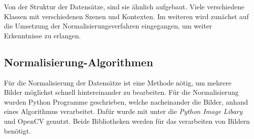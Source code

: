 \documentclass[a4paper,12pt,oneside]{article}
\begin{document}
Von der Struktur der Datensätze, sind sie ähnlich aufgebaut. Viele verschiedene Klassen mit verschiedenen Szenen und Kontexten. Im weiteren wird zunächst auf die Umsetzung der Normalisierungsverfahren eingegangen, um weiter Erkenntnisse zu erlangen.
\subsection{Normalisierung-Algorithmen}\label{s.nalgorithmen}
Für die Normalisierung der Datensätze ist eine Methode nötig, um mehrere Bilder möglichst schnell hintereinander zu bearbeiten. Für die Normalisierung wurden Python Programme geschrieben, welche nacheinander die Bilder, anhand eines Algorithmus verarbeitet. Dafür wurde mit unter die \textit{Python Image Libary} und OpenCV genutzt. Beide Bibliotheken werden für das verarbeiten von Bildern benötigt. 
\end{document}
